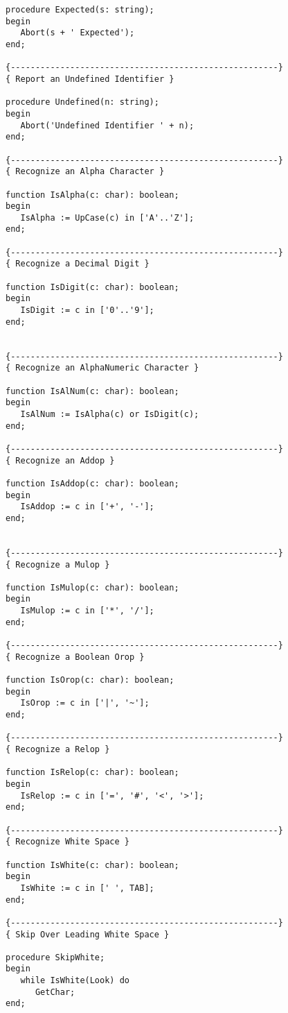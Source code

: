 \begin{verbatim}
procedure Expected(s: string);
begin
   Abort(s + ' Expected');
end;

{------------------------------------------------------}
{ Report an Undefined Identifier }

procedure Undefined(n: string);
begin
   Abort('Undefined Identifier ' + n);
end;

{------------------------------------------------------}
{ Recognize an Alpha Character }

function IsAlpha(c: char): boolean;
begin
   IsAlpha := UpCase(c) in ['A'..'Z'];
end;

{------------------------------------------------------}
{ Recognize a Decimal Digit }

function IsDigit(c: char): boolean;
begin
   IsDigit := c in ['0'..'9'];
end;


{------------------------------------------------------}
{ Recognize an AlphaNumeric Character }

function IsAlNum(c: char): boolean;
begin
   IsAlNum := IsAlpha(c) or IsDigit(c);
end;

{------------------------------------------------------}
{ Recognize an Addop }

function IsAddop(c: char): boolean;
begin
   IsAddop := c in ['+', '-'];
end;


{------------------------------------------------------}
{ Recognize a Mulop }

function IsMulop(c: char): boolean;
begin
   IsMulop := c in ['*', '/'];
end;

{------------------------------------------------------}
{ Recognize a Boolean Orop }

function IsOrop(c: char): boolean;
begin
   IsOrop := c in ['|', '~'];
end;

{------------------------------------------------------}
{ Recognize a Relop }

function IsRelop(c: char): boolean;
begin
   IsRelop := c in ['=', '#', '<', '>'];
end;

{------------------------------------------------------}
{ Recognize White Space }

function IsWhite(c: char): boolean;
begin
   IsWhite := c in [' ', TAB];
end;

{------------------------------------------------------}
{ Skip Over Leading White Space }

procedure SkipWhite;
begin
   while IsWhite(Look) do
      GetChar;
end;


\end{verbatim}
